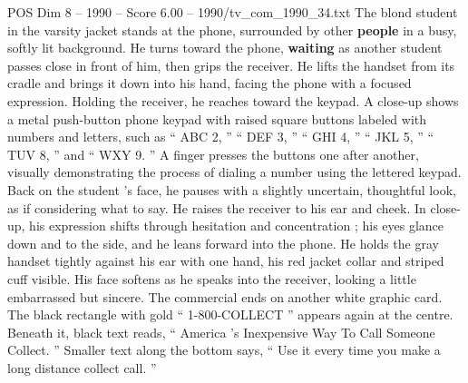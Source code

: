 \begin{textsample}{POS Dim 8 – 1990 – Score 6.00 – 1990/tv\_com\_1990\_34.txt}
The blond student in the varsity jacket stands at the phone, surrounded by other \textbf{people} in a busy, softly lit background.
He turns toward the phone, \textbf{waiting} as another student passes close in front of him, then grips the receiver.
He lifts the handset from its cradle and brings it down into his hand, facing the phone with a focused expression.
Holding the receiver, he reaches toward the keypad.
A close-up shows a metal push-button phone keypad with raised square buttons labeled with numbers and letters, such as “ ABC 2, ” “ DEF 3, ” “ GHI 4, ” “ JKL 5, ” “ TUV 8, ” and “ WXY 9. ” A finger presses the buttons one after another, visually demonstrating the process of dialing a number using the lettered keypad.
Back on the student ’s face, he pauses with a slightly uncertain, thoughtful look, as if considering what to say.
He raises the receiver to his ear and cheek.
In close-up, his expression shifts through hesitation and concentration ; his eyes glance down and to the side, and he leans forward into the phone.
He holds the gray handset tightly against his ear with one hand, his red jacket collar and striped cuff visible.
His face softens as he speaks into the receiver, looking a little embarrassed but sincere.
The commercial ends on another white graphic card.
The black rectangle with gold “ 1-800-COLLECT ” appears again at the centre.
Beneath it, black text reads, “ America ’s Inexpensive Way To Call Someone Collect. ” Smaller text along the bottom says, “ Use it every time you make a long distance collect call. ”

\end{textsample}
